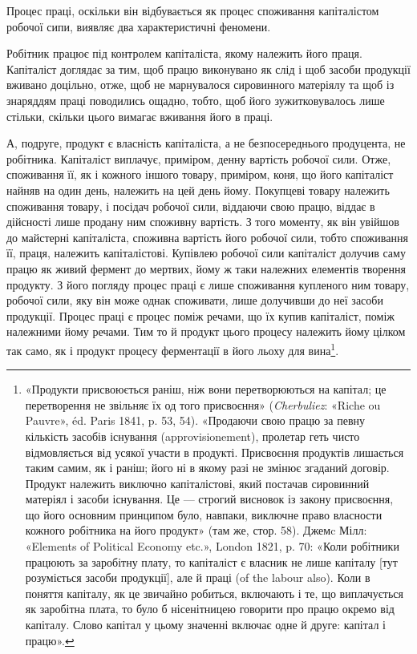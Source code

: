 
Процес праці, оскільки він відбувається як процес споживання
капіталістом робочої сипи, виявляє два характеристичні феномени.

Робітник працює під контролем капіталіста, якому належить
його праця. Капіталіст доглядає за тим, щоб працю виконувано
як слід і щоб засоби продукції вживано доцільно, отже, щоб не
марнувалося сировинного матеріялу та щоб із знаряддям праці
поводились ощадно, тобто, щоб його зужитковувалось лише
стільки, скільки цього вимагає вживання його в праці.

А, подруге, продукт є власність капіталіста, а не безпосереднього
продуцента, не робітника. Капіталіст виплачує, приміром,
денну вартість робочої сили. Отже, споживання її, як і кожного
іншого товару, приміром, коня, що його капіталіст найняв на
один день, належить на цей день йому. Покупцеві товару належить
споживання товару, і посідач робочої сили, віддаючи свою
працю, віддає в дійсності лише продану ним споживну вартість.
З того моменту, як він увійшов до майстерні капіталіста, споживна
вартість його робочої сили, тобто споживання її, праця, належить
капіталістові. Купівлею робочої сили капіталіст долучив саму
працю як живий фермент до мертвих, йому ж таки належних
елементів творення продукту. З його погляду процес праці є
лише споживання купленого ним товару, робочої сили, яку він
може однак споживати, лише долучивши до неї засоби продукції.
Процес праці є процес поміж речами, що їх купив капіталіст,
поміж належними йому речами. Тим то й продукт цього процесу
належить йому цілком так само, як і продукт процесу ферментації
в його льоху для вина\footnote{
«Продукти присвоюється раніш, ніж вони перетворюються на
капітал; це перетворення не звільняє їх од того присвоєння» (\emph{Cherbuliez}:
«Riche ou Pauvre», éd. Paris 1841, p. 53, 54). «Продаючи свою
працю за певну кількість засобів існування (approvisionement), пролетар
геть чисто відмовляється від усякої участи в продукті. Присвоєння продуктів
лишається таким самим, як і раніш; його ні в якому разі не змінює
згаданий договір. Продукт належить виключно капіталістові, який постачав
сировинний матеріял і засоби існування. Це — строгий висновок
із закону присвоєння, що його основним принципом було, навпаки, виключне
право власности кожного робітника на його продукт» (там же,
стор. 58). Джемc Мілл: «Elements of Political Economy etc.», London
1821, p. 70: «Коли робітники працюють за заробітну плату, то капіталіст
є власник не лише капіталу [тут розуміється засоби продукції], але
й праці (of the labour also). Коли в поняття капіталу, як це звичайно
робиться, включають і те, що виплачується як заробітна плата, то було б
нісенітницею говорити про працю окремо від капіталу. Слово капітал у
цьому значенні включає одне й друге: капітал і працю».
}.

